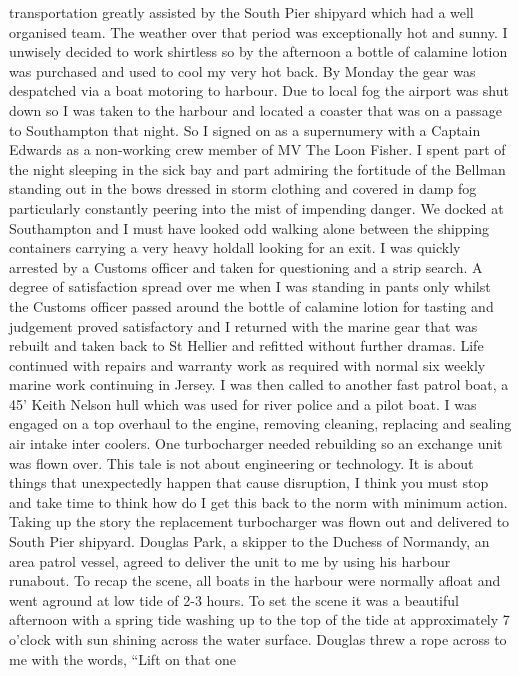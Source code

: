 transportation greatly assisted by the South Pier shipyard which had a well
organised team. The weather over that period was exceptionally hot and sunny. I
unwisely decided to work shirtless so by the afternoon a bottle of calamine
lotion was purchased and used to cool my very hot back. By Monday the gear was
despatched via a boat motoring to harbour. Due to local fog the airport was
shut down so I was taken to the harbour and located a coaster that was on a
passage to Southampton that night. So I signed on as a supernumery with a
Captain Edwards as a non-working crew member of MV The Loon Fisher. I spent
part of the night sleeping in the sick bay and part admiring the fortitude of
the Bellman standing out in the bows dressed in storm clothing and covered in
damp fog particularly constantly peering into the mist of impending danger. We
docked at Southampton and I must have looked odd walking alone between the
shipping containers carrying a very heavy holdall looking for an exit. I was
quickly arrested by a Customs officer and taken for questioning and a strip
search. A degree of satisfaction spread over me when I was standing in pants
only whilst the Customs officer passed around the bottle of calamine lotion for
tasting and judgement proved satisfactory and I returned with the marine gear
that was rebuilt and taken back to St Hellier and refitted without further
dramas. Life continued with repairs and warranty work as required with normal
six weekly marine work continuing in Jersey. I was then called to another fast
patrol boat, a 45' Keith Nelson hull which was used for river police and a
pilot boat. I was engaged on a top overhaul to the engine, removing cleaning,
replacing and sealing air intake inter coolers. One turbocharger needed
rebuilding so an exchange unit was flown over. This tale is not about
engineering or technology. It is about things that unexpectedly happen that
cause disruption, I think you must stop and take time to think how do I get
this back to the norm with minimum action. Taking up the story the replacement
turbocharger was flown out and delivered to South Pier shipyard. Douglas Park,
a skipper to the Duchess of Normandy, an area patrol vessel, agreed to deliver
the unit to me by using his harbour runabout. To recap the scene, all boats in
the harbour were normally afloat and went aground at low tide of 2-3 hours. To
set the scene it was a beautiful afternoon with a spring tide washing up to the
top of the tide at approximately 7 o'clock with sun shining across the water
surface. Douglas threw a rope across to me with the words, ``Lift on that one
